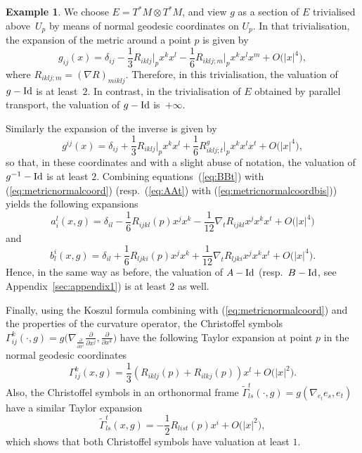 \documentclass[pdftex]{sigma}
\numberwithin{equation}{section}
\theoremstyle{definition}
\newtheorem{ex}[thm]{Example}
\begin{document}
\begin{ex} We choose $E=T^*M\otimes T^*M$, and view $g$ as a section of $E$ trivialised above~$U_p$ by means of normal geodesic coordinates on $U_p$. In that trivialisation, the expansion of the metric around a point $p$ is given by
\begin{equation}\label{eq:metricnormalcoord}
g_{ij}(x)=\delta_{ij}-\frac{1}{3}R_{ikl j}\bigg\vert_p x^k x^l-\frac{1}{6} R_{ikl j;m}\bigg\vert_p x^k x^l x^m +O\bigl(|x|^4\bigr),
\end{equation}
where $R_{iklj;m}=(\nabla R)_{m iklj}.$ Therefore, in this trivialisation, the valuation of $g-{\rm Id}$ is at least~$2$. In contrast, in the trivialisation of $E$ obtained by parallel transport, the valuation of $g-{\rm Id}$ is~$+\infty$.

Similarly the expansion of the inverse is given by
 \begin{equation}\label{eq:metricnormalcoordbis}
 g^{ij}(x) =\delta_{ij}+\frac{1}{3}R_{ikl j}\bigg\vert_p x^k x^l+\frac{1}{6} R_{ikl j;t}^g\bigg\vert_px^k x^l x^t +O\bigl(|x|^4\bigr),
 \end{equation}
 so that, in these coordinates and with a slight abuse of notation, the valuation of $g^{-1}-{\rm Id}$ is at least $2$. Combining equations~(\ref{eq:BBt}) with (\ref{eq:metricnormalcoord}) (resp.\ (\ref{eq:AAt}) with (\ref{eq:metricnormalcoordbis})) yields the following expansions \cite[equation~(11)]{AGHM}
\begin{equation*}%
a_i^l(x, g)=\delta_{il}-\frac{1}{6}R_{ijk l}( p) x^j x^k-\frac{1}{12}\nabla_t R_{ijk l}x^j x^k x^t+O\bigl(|x|^4\bigr)\end{equation*}
 and
 \begin{equation*}%
 b_l^i(x, g)=\delta_{il}+\frac{1}{6}R_{ljk i}( p) x^j x^k+\frac{1}{12}\nabla_t R_{ljk i}x^j x^k x^t+O\bigl(|x|^4\bigr).
 \end{equation*}
Hence, in the same way as before, the valuation of $A-{\rm Id}$ (resp.\ $B-{\rm Id}$, see Appendix~\ref{sec:appendix1}) is at least $2$ as well.

Finally, using the Koszul formula combining with (\ref{eq:metricnormalcoord}) and the properties of the curvature operator, the Christoffel symbols $\Gamma_{ij}^k (\cdot, g)=g\bigl(\nabla_{\frac{\partial}{\partial x^i}} \frac{\partial}{\partial x^j}, \frac{\partial}{\partial x^k}\bigr)$ have the following Taylor expansion at point $p$ in the normal geodesic coordinates
\[\Gamma_{ij}^k(x,g)=\frac{1}{3}(R_{i k l j}(p)+R_{i l k j}(p)) x^l+ O\bigl(\vert x\vert^2\bigr).\]
Also, the Christoffel symbols in an orthonormal frame $\tilde\Gamma_{ls}^t(\cdot,g)=g(\nabla_{e_l}e_s,e_t)$ have a similar Taylor expansion
\begin{equation}\label{eq:Gammatilde}
\tilde\Gamma_{ls}^t(x,g)=-\frac{1}{2}R_{li st}(p) x^i+O\bigl(\vert x\vert^2\bigr),
\end{equation}
which shows that both Christoffel symbols have valuation at least $1$.
\end{ex}
\end{document}
